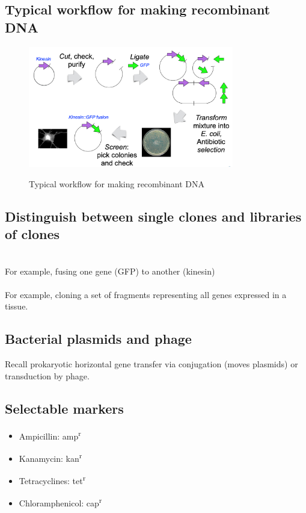 \subsection{Typical workflow for making recombinant DNA}
\begin{figure}[h]
\centering
\includegraphics[width=0.8\textwidth]{images/lecture4-1.png}\\[.2in]
\caption{Typical workflow for making recombinant DNA} 
\end{figure}
\subsection{Distinguish between single clones and libraries of clones}
\\
For example, fusing one gene (GFP) to another (kinesin)\\[.2in]
\\
For example, cloning a set of fragments representing all genes expressed in a tissue.
\subsection{Bacterial plasmids and phage}
Recall prokaryotic horizontal gene transfer via conjugation (moves plasmids) or transduction by phage.
\subsection{Selectable markers}
\begin{itemize}[noitemsep]
    \item Ampicillin: amp\textsuperscript{r}
    \item Kanamycin: kan\textsuperscript{r}
    \item Tetracyclines: tet\textsuperscript{r}
    \item Chloramphenicol: cap\textsuperscript{r}
\end{itemize}
